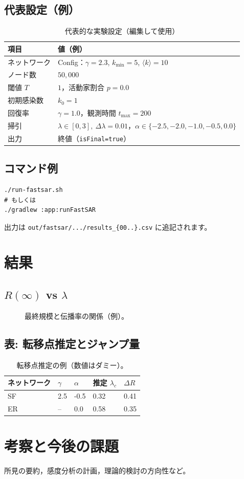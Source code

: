 \documentclass[uplatex,dvipdfmx,11pt]{bxjsarticle}
\begin{document}
\subsection{代表設定（例）}
\begin{table}[htbp]
  \centering
  \caption{代表的な実験設定（編集して使用）}
  \begin{tabular}{@{}ll@{}}\toprule
    項目 & 値（例） \\ \midrule
    ネットワーク & Config：$\gamma=2.3$, $k_{\min}=5$, $\langle k\rangle=10$ \\
    ノード数 & $50{,}000$ \\
    閾値 $T$ & $1$，活動家割合 $p=0.0$ \\
    初期感染数 & $k_0=1$ \\
    回復率 & $\gamma=1.0$，観測時間 $t_{\max}=200$ \\
    掃引 & $\lambda\in[0,3],\ \Delta\lambda=0.01$，$\alpha\in\{-2.5,-2.0,-1.0,-0.5,0.0\}$ \\
    出力 & 終値（\texttt{isFinal=true}） \\
  \bottomrule\end{tabular}
\end{table}

\subsection{コマンド例}
\begin{verbatim}
./run-fastsar.sh
# もしくは
./gradlew :app:runFastSAR
\end{verbatim}
出力は \verb|out/fastsar/.../results_{00..}.csv| に追記されます。

\section{結果}
\subsection{\texorpdfstring{$R(\infty)$}{R(infty)} vs \texorpdfstring{$\lambda$}{lambda}}
\begin{figure}[htbp]
  \centering
  \caption{最終規模と伝播率の関係（例）。}
\end{figure}

\subsection{表: 転移点推定とジャンプ量}
\begin{table}[htbp]
  \centering
  \begin{tabular}{@{}lllll@{}}\toprule
    ネットワーク & $\gamma$ & $\alpha$ & 推定 $\lambda_c$ & $\Delta R$ \\ \midrule
    SF & 2.5 & -0.5 & 0.32 & 0.41 \\
    ER & --  & 0.0  & 0.58 & 0.35 \\
  \bottomrule\end{tabular}
  \caption{転移点推定の例（数値はダミー）。}
\end{table}

\section{考察と今後の課題}
所見の要約，感度分析の計画，理論的検討の方向性など。

\printbibliography
\end{document}
